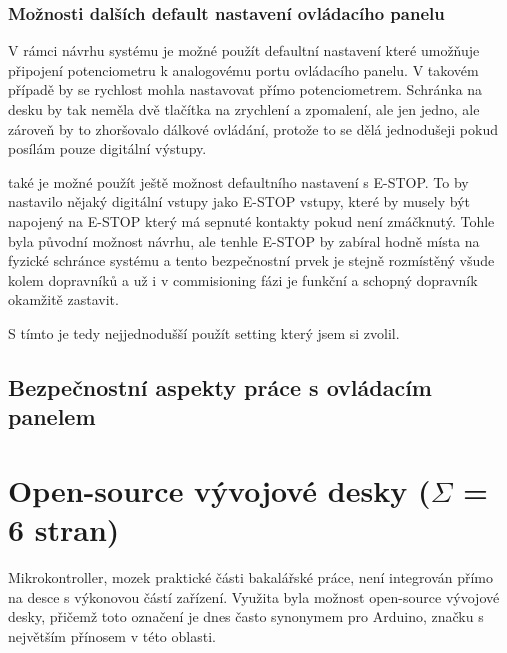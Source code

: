 \subsubsection{Možnosti dalších default nastavení ovládacího panelu}

V rámci návrhu systému je možné použít defaultní nastavení které umožňuje připojení potenciometru k analogovému portu ovládacího panelu. V takovém případě by se rychlost mohla nastavovat přímo potenciometrem. Schránka na desku by tak neměla dvě tlačítka na zrychlení a zpomalení, ale jen jedno, ale zároveň by to zhoršovalo dálkové ovládání, protože to se dělá jednodušeji pokud posílám pouze digitální výstupy.

také je možné použít ještě možnost defaultního nastavení s E-STOP. To by nastavilo nějaký digitální vstupy jako E-STOP vstupy, které by musely být napojený na E-STOP který má sepnuté kontakty pokud není zmáčknutý. Tohle byla původní možnost návrhu, ale tenhle E-STOP by zabíral hodně místa na fyzické schránce systému a tento bezpečnostní prvek je stejně rozmístěný všude kolem dopravníků a už i v commisioning fázi je funkční a schopný dopravník okamžitě zastavit.

S tímto je tedy nejjednodušší použít setting který jsem si zvolil.

\subsection{Bezpečnostní aspekty práce s ovládacím panelem}

\section{Open-source vývojové desky ($\Sigma$ = 6 stran)}

Mikrokontroller, mozek praktické části bakalářské práce, není integrován přímo na desce s výkonovou částí zařízení. Využita byla možnost open-source vývojové desky, přičemž toto označení je dnes často synonymem pro Arduino, značku s největším přínosem v této oblasti.

